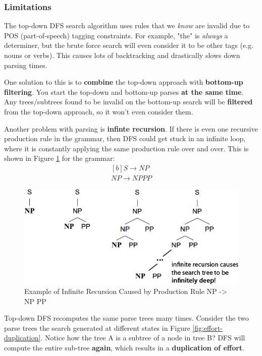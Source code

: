 \documentclass{article}
\begin{document}
\subsubsection{Limitations}

The top-down DFS search algorithm uses rules that we \textit{know} are invalid due to POS (part-of-speech) tagging constraints. For example, "the" is \textit{always} a determiner, but the brute force search will even consider it to be other tags (e.g. nouns or verbs). This causes lots of backtracking and drastically slows down parsing times.

One solution to this is to \textbf{combine} the top-down approach with \textbf{bottom-up filtering}. You start the top-down and bottom-up parses \textbf{at the same time}. Any trees/subtrees found to be invalid on the bottom-up search will be \textbf{filtered} from the top-down approach, so it won't even consider them.

Another problem with parsing is \textbf{infinte recursion}. If there is even one recursive production rule in the grammar, then DFS could get stuck in an infinite loop, where it is constantly applying the same production rule over and over. This is shown in Figure \ref{fig:infinite-recursion} for the grammar:
\begin{equation}
\begin{aligned}[b]
S \rightarrow NP \\
NP \rightarrow NP PP
\end{aligned}
\end{equation}

\begin{figure}
	\centering
	\includegraphics[scale=0.4]{figures/infinite-recursion.png}
	\caption{Example of Infinite Recursion Caused by Production Rule NP -> NP PP}
	\label{fig:infinite-recursion}
\end{figure}

Top-down DFS recomputes the same parse trees many times. Consider the two parse trees the search generated at different states in Figure \ref{fig:effort-duplication}. Notice how the tree A is a subtree of a node in tree B? DFS will compute the entire sub-tree \textbf{again}, which results in a \textbf{duplication of effort}.
\end{document}
